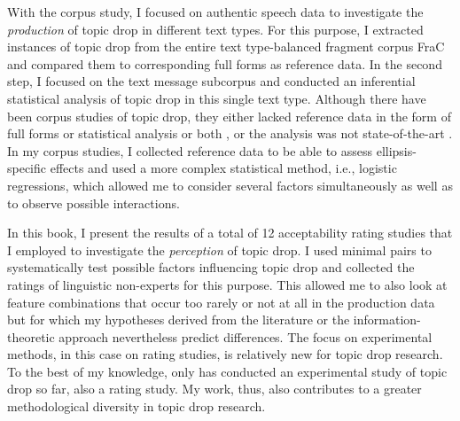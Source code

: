 With the corpus study, I focused on authentic speech data to investigate the \emph{production} of topic drop in different text types.
For this purpose, I extracted instances of topic drop from the entire text type-balanced fragment corpus FraC \citep{horch.reich2017} and compared them to corresponding full forms as reference data.
In the second step, I focused on the text message subcorpus and conducted an inferential statistical analysis of topic drop in this single text type.
Although there have been corpus studies of topic drop, they either lacked reference data in the form of full forms or statistical analysis or both \citep[e.g.,][]{auer1993,androutsopoulos.schmidt2002, doring2002, helmer2016}, or the analysis was not state-of-the-art \citep{frick2017}.
In my corpus studies, I collected reference data to be able to assess ellipsis-specific effects and used a more complex statistical method, i.e., logistic regressions, which allowed me to consider several factors simultaneously as well as to observe possible interactions. 

In this book, I present the results of a total of 12 acceptability rating studies  that I employed to investigate the \emph{perception} of topic drop.
I used minimal pairs to systematically test possible factors influencing topic drop and collected the ratings of linguistic non-experts for this purpose.
This allowed me to also look at feature combinations that occur too rarely or not at all in the production  data but for which my hypotheses derived from the literature or the information\hyp theoretic  approach nevertheless predict differences.
The focus on experimental methods, in this case on rating studies, is relatively new for topic drop research.
To the best of my knowledge, only \citet{trutkowski2018} has conducted an experimental study of topic drop so far, also a rating study.
My work, thus, also contributes to a greater methodological diversity in topic drop research.

